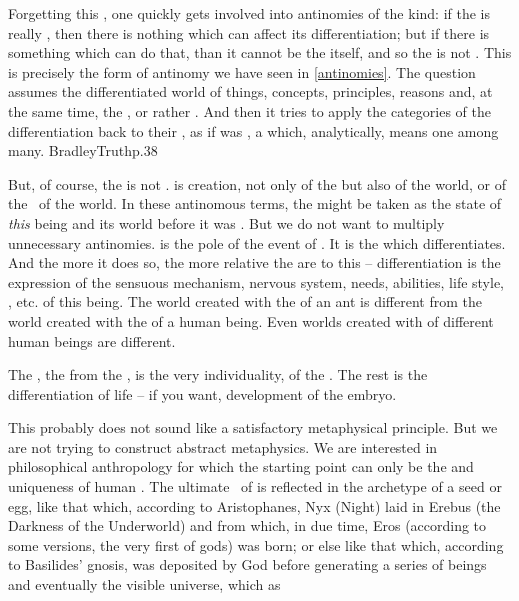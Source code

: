 Forgetting this , one quickly gets involved into antinomies of the
kind: if the  is really , then there is nothing which can
affect its differentiation; but if there is something which can do that, than it
cannot be the  itself, and so the  is not .  This is
precisely the form of antinomy we have seen in \ref{antinomies}. The question
assumes the differentiated world of things, concepts, principles, reasons and,
at the same time,  the , or rather .  And then it
tries to apply the  categories of the differentiation back to
their , as if  was , a 
which, analytically, means one among many.  \citet{You cannot take reality to
  pieces and then see how once more it can be combined to make
  reality.}{BradleyTruth}{p.38}


 But, of course, the  is not .   is creation, not
only of the  but also of the world, or of the \nexus\ of the
world. In these antinomous terms, the  might be taken as the state of
{\em this} being and its world before it was . But we do not want to
multiply unnecessary antinomies.  is the  pole of the
event of . It is the  which differentiates.  And the
more it does so, the more relative the  are to this
 -- differentiation is the expression of the sensuous mechanism,
nervous system, needs, abilities, life style, , etc.  of this
being.  The world created with the  of an ant is different from the
world created with the  of a human being.  Even worlds created with
 of different human beings are different.

The , the  from the , is the very
individuality,  of the .  The rest is the
differentiation of life -- if you want, development of the
embryo.

\pa
This probably does not sound like a satisfactory metaphysical principle. But we
are not trying to construct abstract metaphysics. We are interested in
philosophical anthropology for which the starting point can only be the 
and uniqueness of human .
The ultimate \nexus\ of  is reflected in the archetype of a seed or
egg, like that which, according to Aristophanes, {Nyx}
(Night) laid in {Erebus} (the Darkness of the 
Underworld) and from which, in due time, {Eros} (according to some versions,
the very first of gods) was born; or else like that
which, according to Basilides' gnosis, was deposited by God 
before generating a series of beings and eventually the visible universe, which
as  

